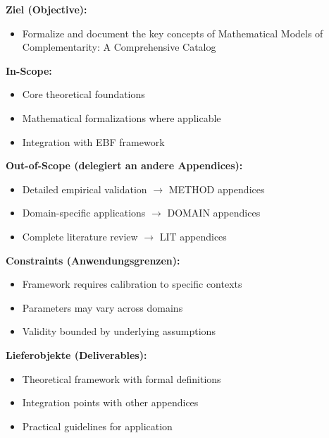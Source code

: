 \begin{tcolorbox}[
    colback=orange!5!white,
    colframe=orange!75!black,
    title={\textbf{Appendix Scope: Ziel / In-Scope / Out-of-Scope / Constraints}},
    fonttitle=\bfseries
]

\textbf{Ziel (Objective):}
\begin{itemize}[nosep]
    \item Formalize and document the key concepts of Mathematical Models of Complementarity: A Comprehensive Catalog
\end{itemize}

\textbf{In-Scope:}
\begin{itemize}[nosep]
    \item Core theoretical foundations
    \item Mathematical formalizations where applicable
    \item Integration with EBF framework
\end{itemize}

\textbf{Out-of-Scope (delegiert an andere Appendices):}
\begin{itemize}[nosep]
    \item Detailed empirical validation $\rightarrow$ METHOD appendices
    \item Domain-specific applications $\rightarrow$ DOMAIN appendices
    \item Complete literature review $\rightarrow$ LIT appendices
\end{itemize}

\textbf{Constraints (Anwendungsgrenzen):}
\begin{itemize}[nosep]
    \item Framework requires calibration to specific contexts
    \item Parameters may vary across domains
    \item Validity bounded by underlying assumptions
\end{itemize}

\textbf{Lieferobjekte (Deliverables):}
\begin{itemize}[nosep]
    \item Theoretical framework with formal definitions
    \item Integration points with other appendices
    \item Practical guidelines for application
\end{itemize}

\end{tcolorbox}

